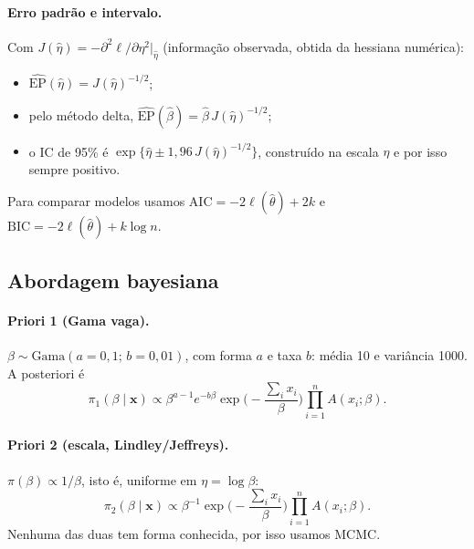 \documentclass[11pt,a4paper]{article}
\begin{document}
\paragraph{Erro padrão e intervalo.} Com $J(\hat\eta)=-\partial^2\ell/\partial\eta^2|_{\hat\eta}$ (informação observada, obtida da hessiana numérica):
\begin{itemize}
\item $\widehat{\text{EP}}(\hat\eta)=J(\hat\eta)^{-1/2}$;
\item pelo método delta, $\widehat{\text{EP}}(\hat\beta)=\hat\beta\,J(\hat\eta)^{-1/2}$;
\item o IC de 95\% é $\exp\{\hat\eta\pm1{,}96\,J(\hat\eta)^{-1/2}\}$, construído na escala $\eta$ e por isso sempre positivo.
\end{itemize}
Para comparar modelos usamos $\text{AIC}=-2\ell(\hat\theta)+2k$ e $\text{BIC}=-2\ell(\hat\theta)+k\log n$.

\subsection{Abordagem bayesiana}

\paragraph{Priori 1 (Gama vaga).} $\beta\sim\text{Gama}(a=0{,}1;\,b=0{,}01)$, com forma $a$ e taxa $b$: média 10 e variância 1000. A posteriori é
\begin{equation}
\pi_1(\beta\mid\mathbf x)\propto\beta^{a-1}e^{-b\beta}\exp\Big(-\frac{\sum_ix_i}{\beta}\Big)\prod_{i=1}^nA(x_i;\beta).
\end{equation}

\paragraph{Priori 2 (escala, Lindley/Jeffreys).} $\pi(\beta)\propto1/\beta$, isto é, uniforme em $\eta=\log\beta$:
\begin{equation}
\pi_2(\beta\mid\mathbf x)\propto\beta^{-1}\exp\Big(-\frac{\sum_ix_i}{\beta}\Big)\prod_{i=1}^nA(x_i;\beta).
\end{equation}
Nenhuma das duas tem forma conhecida, por isso usamos MCMC.
\end{document}
